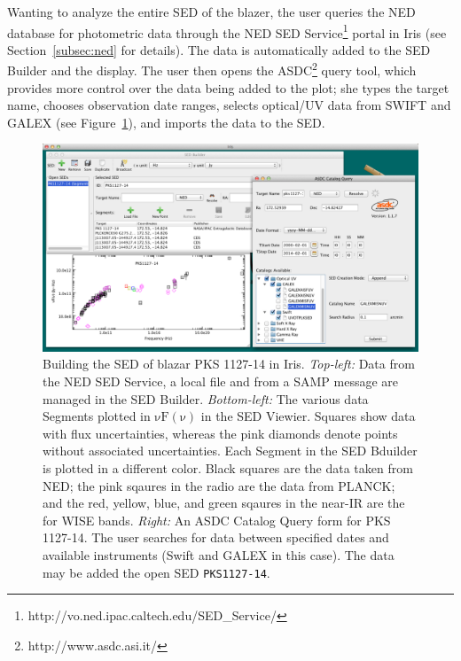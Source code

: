 \documentclass[5p]{elsarticle}
\begin{document}
Wanting to analyze the entire SED of the blazer, the user queries the NED database for photometric data through the NED SED Service\footnote{http://vo.ned.ipac.caltech.edu/SED\_Service/} portal in Iris (see Section~\ref{subsec:ned} for details). The data is automatically added to the SED Builder and the display. The user then opens the ASDC\footnote{http://www.asdc.asi.it/} query tool, which provides more control over the data being added to the plot; she types the target name, chooses observation date ranges, selects optical/UV data from SWIFT and GALEX (see Figure~\ref{fig:load_data}), and imports the data to the SED.

\begin{figure}
\begin{center}
\includegraphics[width=\columnwidth]{figures/built-in-visuals-loading1.png}
\caption{\textbf{\textit{\label{fig:load_data}} } Building the SED of blazar PKS 1127-14 in Iris. \textit{Top-left:} Data from the NED SED Service, a local file and from a SAMP message are managed in the SED Builder. \textit{Bottom-left:} The various data Segments plotted in $\mathrm{\nu F \left( \nu \right)}$ in the SED Viewier. Squares show data with flux uncertainties, whereas the pink diamonds denote points without associated uncertainties. Each Segment in the SED Bduilder is plotted in a different color. Black squares are the data taken from NED; the pink sqaures in the radio are the data from PLANCK; and the red, yellow, blue, and green sqaures in the near-IR are the for WISE bands. \textit{Right:} An ASDC Catalog Query form for PKS 1127-14. The user searches for data between specified dates and available instruments (Swift and GALEX in this case). The data may be added the open SED \texttt{PKS1127-14}.}
\end{center}
\end{figure}
\end{document}
